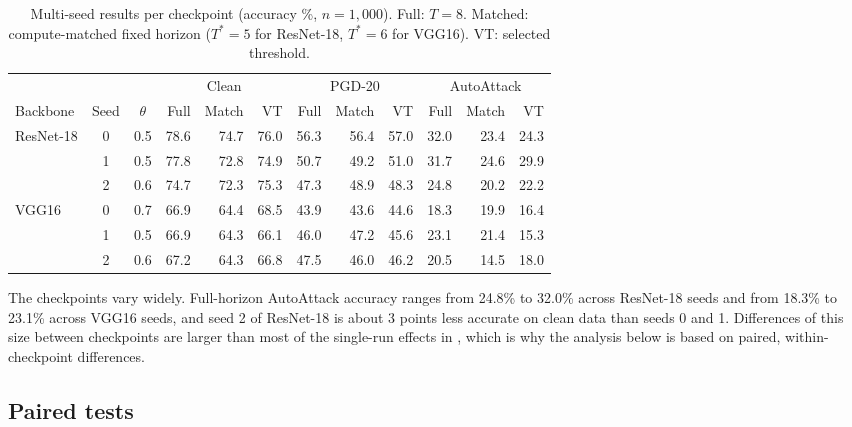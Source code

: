 \begin{table}[htbp]
    \centering
    \caption[Multi-seed results per checkpoint]{Multi-seed results per checkpoint (accuracy \%, $n = 1{,}000$). Full: $T = 8$. Matched: compute-matched fixed horizon ($T^* = 5$ for ResNet-18, $T^* = 6$ for VGG16). VT: selected threshold.}
    \label{tab:res-multiseed}
    \small
    \setlength{\tabcolsep}{4pt}
    \begin{tabular}{@{}l c c r r r r r r r r r@{}}
        \toprule
        & & & \multicolumn{3}{c}{Clean} & \multicolumn{3}{c}{PGD-20} & \multicolumn{3}{c}{AutoAttack} \\
        \cmidrule(lr){4-6} \cmidrule(lr){7-9} \cmidrule(l){10-12}
        Backbone & Seed & $\theta$ & Full & Match & VT & Full & Match & VT & Full & Match & VT \\
        \midrule
        \multirow{3}{*}{ResNet-18} & 0 & 0.5 & 78.6 & 74.7 & 76.0 & 56.3 & 56.4 & 57.0 & 32.0 & 23.4 & 24.3 \\
                                   & 1 & 0.5 & 77.8 & 72.8 & 74.9 & 50.7 & 49.2 & 51.0 & 31.7 & 24.6 & 29.9 \\
                                   & 2 & 0.6 & 74.7 & 72.3 & 75.3 & 47.3 & 48.9 & 48.3 & 24.8 & 20.2 & 22.2 \\
        \midrule
        \multirow{3}{*}{VGG16}     & 0 & 0.7 & 66.9 & 64.4 & 68.5 & 43.9 & 43.6 & 44.6 & 18.3 & 19.9 & 16.4 \\
                                   & 1 & 0.5 & 66.9 & 64.3 & 66.1 & 46.0 & 47.2 & 45.6 & 23.1 & 21.4 & 15.3 \\
                                   & 2 & 0.6 & 67.2 & 64.3 & 66.8 & 47.5 & 46.0 & 46.2 & 20.5 & 14.5 & 18.0 \\
        \bottomrule
    \end{tabular}
\end{table}

The checkpoints vary widely. Full-horizon AutoAttack accuracy ranges from 24.8\% to 32.0\% across ResNet-18 seeds and from 18.3\% to 23.1\% across VGG16 seeds, and seed 2 of ResNet-18 is about 3 points less accurate on clean data than seeds 0 and 1. Differences of this size between checkpoints are larger than most of the single-run effects in , which is why the analysis below is based on paired, within-checkpoint differences.

\subsection{Paired tests}

